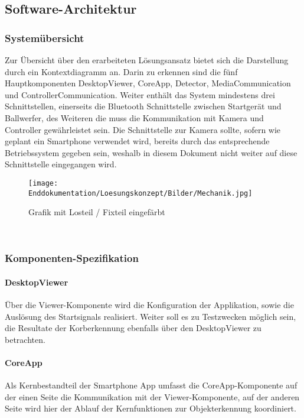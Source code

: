 \subsection{Software-Architektur}
	\subsubsection{Systemübersicht}
	Zur Übersicht über den erarbeiteten Lösungsansatz bietet sich die Darstellung durch ein Kontextdiagramm an. Darin zu erkennen sind die fünf Hauptkomponenten  DesktopViewer, CoreApp, Detector, MediaCommunication und ControllerCommunication. Weiter enthält das System mindestens drei Schnittstellen, einerseits die Bluetooth Schnittstelle zwischen Startgerät und Ballwerfer, des Weiteren die muss die Kommunikation mit Kamera und Controller gewährleistet sein. Die Schnittstelle zur Kamera sollte, sofern wie geplant ein Smartphone verwendet wird, bereits durch das entsprechende Betriebssystem gegeben sein, weshalb in diesem Dokument nicht weiter auf diese Schnittstelle eingegangen wird.\\

\begin{figure}
		\centering
		\texttt{[image: Enddokumentation/Loesungskonzept/Bilder/Mechanik.jpg]}
		\caption{Grafik mit Losteil / Fixteil eingefärbt}
		\label{fig:Mechanik}	
\end{figure}\\

	\subsubsection{Komponenten-Spezifikation}
		\paragraph{DesktopViewer}
		Über die Viewer-Komponente wird die Konfiguration der Applikation, sowie die Auslösung des Startsignals realisiert. Weiter soll es zu Testzwecken möglich sein, die Resultate der Korberkennung ebenfalls über den DesktopViewer zu betrachten.
		
		\paragraph{CoreApp}
		Als Kernbestandteil der Smartphone App umfasst die CoreApp-Komponente auf der einen Seite die Kommunikation mit der Viewer-Komponente, auf der anderen Seite wird hier der Ablauf der Kernfunktionen zur Objekterkennung koordiniert.
		
